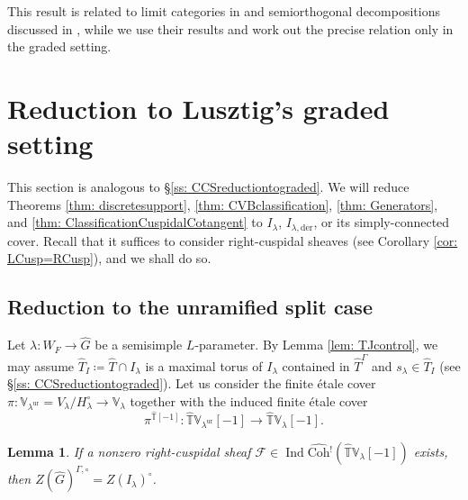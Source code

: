 \documentclass{amsart}
\newtheorem{lemma}[theorem]{Lemma}
\theoremstyle{definition}
\theoremstyle{remark}
\numberwithin{equation}{section}
\DeclareMathOperator{\Ind}{Ind}
\newcommand{\der}{\mathrm{der}}
\newcommand{\mc}{\mathcal}
\newcommand{\wh}{\widehat}
\newcommand{\Coh}{\mathrm{Coh}}
\newcommand{\ur}{\mathrm{ur}}
\newcommand{\V}{\mathbb{V}}
\newcommand{\T}{\mathbb{T}}
\begin{document}
This result is related to limit categories in \cite{PTDolbeault} and semiorthogonal decompositions discussed in \cite{BuPadurariuToda}, while we use their results and work out the precise relation only in the graded setting. 

\section{Reduction to Lusztig's graded setting}{\label{s: cohreductiontograded}}
This section is analogous to \S \ref{ss: CCSreductiontograded}. We will reduce Theorems \ref{thm: discretesupport}, \ref{thm: CVBclassification}, \ref{thm: Generators}, and \ref{thm: ClassificationCuspidalCotangent} to $I_\lambda$, $I_{\lambda, \der}$, or its simply-connected cover. Recall that it suffices to consider right-cuspidal sheaves (see Corollary \ref{cor: LCusp=RCusp}), and we shall do so. 

\subsection{Reduction to the unramified split case}
Let $\lambda\colon W_F \to \wh G$ be a semisimple $L$-parameter. By Lemma \ref{lem: TJcontrol}, we may assume $\wh T_I\coloneq\wh {T}\cap I_\lambda$ is a maximal torus of $I_\lambda$ contained in $\wh T^\Gamma$ and $s_\lambda\in \wh T_I$ (see \S\ref{ss: CCSreductiontograded}). Let us consider the finite \'etale cover $\pi\colon \V_{\lambda^\ur}=V_\lambda/H_\lambda^\circ\to \V_\lambda$ together with the induced finite \'etale cover
\[
\pi^{\wh{\T}[-1]}\colon \wh{\T}\V_{\lambda^\ur}[-1] \to \wh{\T}\V_{\lambda}[-1]. 
\]

\begin{lemma}\label{lem: CuspILambdaCenter}
If a nonzero right-cuspidal sheaf $\mc F\in \Ind\wh{\Coh}{}^! (\wh{\T}\V_\lambda[-1])$ exists, then $Z(\wh G)^{\Gamma,\circ}=Z(I_\lambda)^{\circ}$.     
\end{lemma}
\end{document}
